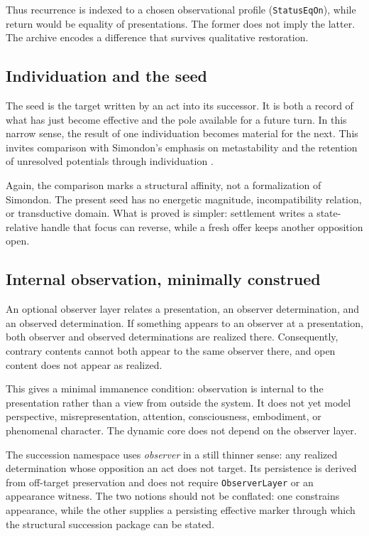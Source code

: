 \documentclass[11pt]{article}
\theoremstyle{definition}
\theoremstyle{remark}
\newcommand{\lean}[1]{\nolinkurl{#1}}
\begin{document}
Thus recurrence is indexed to a chosen observational profile
(\lean{StatusEqOn}), while return would be equality of presentations. The former
does not imply the latter. The archive encodes a difference that survives
qualitative restoration.

\subsection{Individuation and the seed}

The seed is the target written by an act into its successor. It is both a
record of what has just become effective and the pole available for a future
turn. In this narrow sense, the result of one individuation becomes material
for the next. This invites comparison with Simondon's emphasis on metastability
and the retention of unresolved potentials through individuation
\cite{Simondon2020}.

Again, the comparison marks a structural affinity, not a formalization of
Simondon. The present seed has no energetic magnitude, incompatibility
relation, or transductive domain. What is proved is simpler: settlement writes
a state-relative handle that focus can reverse, while a fresh offer keeps
another opposition open.

\subsection{Internal observation, minimally construed}

An optional observer layer relates a presentation, an observer determination,
and an observed determination. If something appears to an observer at a
presentation, both observer and observed determinations are realized there.
Consequently, contrary contents cannot both appear to the same observer there,
and open content does not appear as realized.

This gives a minimal immanence condition: observation is internal to the
presentation rather than a view from outside the system. It does not yet model
perspective, misrepresentation, attention, consciousness, embodiment, or
phenomenal character. The dynamic core does not depend on the observer layer.

The succession namespace uses \emph{observer} in a still thinner sense: any
realized determination whose opposition an act does not target. Its persistence
is derived from off-target preservation and does not require
\lean{ObserverLayer} or an appearance witness. The two notions should not be
conflated: one constrains appearance, while the other supplies a persisting
effective marker through which the structural succession package can be
stated.
\end{document}

